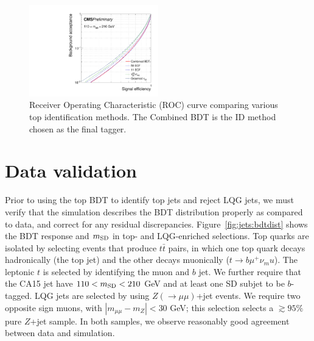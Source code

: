 \begin{figure}[]
    \begin{center}
        \includegraphics[width=0.5\textwidth]{figures/toptagging/bdt/massCut_roc.pdf}
        \caption{Receiver Operating Characteristic (ROC) curve comparing various top identification methods. The Combined BDT is the ID method chosen as the final tagger.}
        \label{fig:jets:roc}
    \end{center}
\end{figure}

\section{Data validation}
\label{sec:jets:sf}

Prior to using the top BDT to identify top jets and reject LQG jets, we must verify that the simulation describes the BDT distribution properly as compared to data, and correct for any residual discrepancies.
Figure~\ref{fig:jets:bdtdist} shows the BDT response and $m_{\mathrm{SD}}$ in top- and LQG-enriched selections.
Top quarks are isolated by selecting events that produce $t\bar{t}$ pairs, in which one top quark decays hadronically (the top jet) and the other decays muonically ($t\rightarrow b\mu^+\nu_mu$).
The leptonic $t$ is selected by identifying the muon and $b$ jet. 
We further require that the CA15 jet have $110<m_{\mathrm{SD}}<210$ GeV and at least one SD subjet to be $b$-tagged.
LQG jets are selected by using $Z(\rightarrow\mu\mu)$+jet events.
We require two opposite sign muons, with $|m_{\mu\mu}-m_Z|<30$ GeV; this selection selects a $\gtrsim95\%$ pure $Z$+jet sample. 
In both samples, we observe reasonably good agreement between data and simulation.

